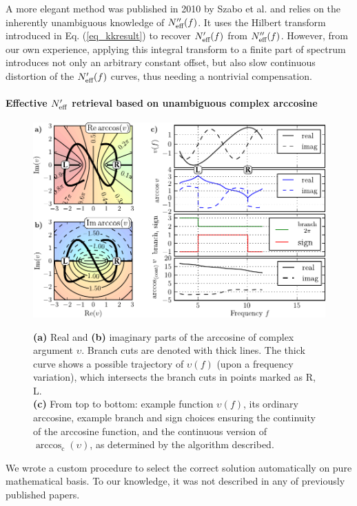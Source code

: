 A more elegant method was published in 2010 by Szabo et al. \cite{szabo2010unique} and relies on the inherently unambiguous knowledge of $N_{\text{eff} }''(f)$. It uses the Hilbert transform introduced in Eq. (\ref{eq_kkresult}) to recover $N_{\text{eff} }'(f)$ from $N_{\text{eff} }''(f)$. 
However, from our own experience, applying this integral transform to a finite part of spectrum introduces not only an arbitrary constant offset, but also slow continuous distortion of the $N_{\text{eff} }'(f)$ curves, thus needing a nontrivial compensation.

\paragraph{Effective $N_{\text{eff} }'$ retrieval based on unambiguous complex arccosine} %
\begin{figure} \centering \caption{\textbf{(a)} Real and \textbf{(b)} imaginary parts of the arccosine of complex argument $\upsilon$. Branch cuts are denoted with thick lines. The thick curve shows a possible trajectory of  $\upsilon(f)$ (upon a frequency variation), which intersects the branch cuts in points marked as R, L.\\ \textbf{(c)} From top to bottom: example function  $\upsilon(f)$, its ordinary arccosine, example branch and sign choices ensuring the continuity of the arccosine function, and the continuous version of $\arccos_{\mathrm{c}}(\upsilon)$, as determined by the algorithm described.} \includegraphics[width=16cm]{img/continuous_arccos/continuous_arccos_new.pdf} \label{fg_arccos}
\end{figure}

We wrote a custom procedure to select the correct solution automatically on pure mathematical basis. To our knowledge, it was not described in any of previously published papers.

